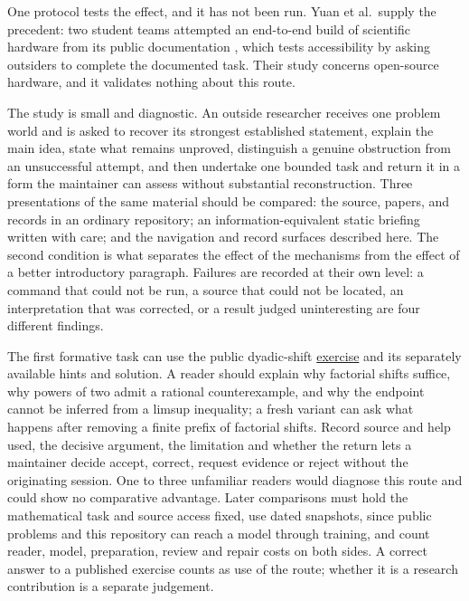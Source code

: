 \documentclass[10pt]{article}
\newcommand{\repobase}{https://github.com/wcook04/plectis-erdos}
\begin{document}
One protocol tests the effect, and it has not been run. Yuan et al.\ supply
the precedent: two student teams attempted an end-to-end build of scientific
hardware from its public documentation \cite{documentationtest}, which tests
accessibility by asking outsiders to complete the documented task. Their study
concerns open-source hardware, and it validates nothing about this route.

The study is small and diagnostic.  An outside researcher receives one problem world and is asked to
recover its strongest established statement, explain the main idea, state what
remains unproved, distinguish a genuine obstruction from an unsuccessful
attempt, and then undertake one bounded task and return it in a form the
maintainer can assess without substantial reconstruction.  Three presentations
of the same material should be compared: the source, papers, and records in an
ordinary repository; an information-equivalent static briefing written with
care; and the navigation and record surfaces described here.  The second
condition is what separates the effect of the mechanisms from the effect of a
better introductory paragraph.  Failures are recorded at their own level: a
command that could not be run, a source that could not be located, an
interpretation that was corrected, or a result judged uninteresting are four
different findings.

The first formative task can use the public dyadic-shift
\href{\repobase/blob/cf2bbe46/research/experiments/premise_exchange/shift_family_exercise.md}{exercise}
and its separately available hints and solution. A reader should explain why
factorial shifts suffice, why powers of two admit a rational counterexample,
and why the endpoint cannot be inferred from a limsup inequality; a fresh
variant can ask what happens after removing a finite prefix of factorial
shifts. Record source and help used, the decisive argument, the limitation and
whether the return lets a maintainer decide accept, correct, request evidence
or reject without the originating session. One to three unfamiliar readers
would diagnose this route and could show no comparative advantage. Later
comparisons must hold the mathematical task and source access fixed, use dated
snapshots, since public problems and this repository can reach a model through
training, and count reader, model, preparation, review and repair costs on both
sides. A correct answer to a published exercise counts as use of the route;
whether it is a research contribution is a separate judgement.
\end{document}
